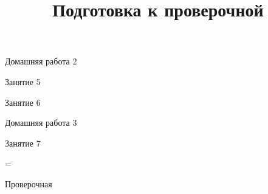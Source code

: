 \begin{homework}[number=2]
	\begin{listofex}
		\item Домашняя работа 2
	\end{listofex}
\end{homework}

\begin{class}[number=5]
	\begin{listofex}
		\item Занятие 5
	\end{listofex}
\end{class}

\begin{class}[number=6]
	\begin{listofex}
		\item Занятие 6
	\end{listofex}
\end{class}

\begin{homework}[number=3]
	\begin{listofex}
		\item Домашняя работа 3
	\end{listofex}
\end{homework}

\begin{class}[number=7]
	\title{Подготовка к проверочной}
	\begin{listofex}
		\item Занятие 7
	\end{listofex}
\end{class}

=%
\begin{exam}
	\begin{listofex}
		\item Проверочная
	\end{listofex}
\end{exam}
